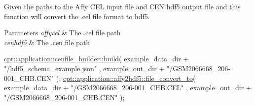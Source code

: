 Given the paths to the Affy C\-E\-L input file and C\-E\-N hdf5 output file and this function will convert the .cel file format to hdf5. 
\begin{DoxyParams}{Parameters}
{\em affycel} & The .cel file path \\
\hline
{\em cenhdf5} & The .cen file path 
\begin{DoxyCodeInclude}
    \hyperlink{namespacecpt_1_1application_1_1cenfile__builder_a2a8bcd0f47ababa94240e923be133a0d}{cpt::application::cenfile\_builder::build}(
          example\_data\_dir + \textcolor{stringliteral}{"/hdf5\_schema\_example.json"}
        , example\_out\_dir + \textcolor{stringliteral}{"/GSM2066668\_206-001\_CHB.CEN"}
    );
    \hyperlink{namespacecpt_1_1application_1_1affy2hdf5_ab477d085c59f33cccea4a4313bcd5e58}{cpt::application::affy2hdf5::file\_convert\_to}(
          example\_data\_dir + \textcolor{stringliteral}{"/GSM2066668\_206-001\_CHB.CEL"}
        , example\_out\_dir + \textcolor{stringliteral}{"/GSM2066668\_206-001\_CHB.CEN"}
    );
\end{DoxyCodeInclude}
\\
\hline
\end{DoxyParams}
